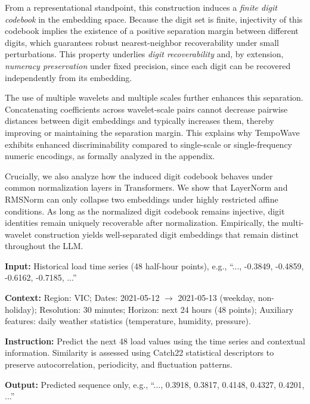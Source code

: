 \documentclass{article}
\begin{document}
From a representational standpoint, this construction induces a \emph{finite digit codebook} in the embedding space.
Because the digit set is finite, injectivity of this codebook implies the existence of a positive separation margin between different digits, which guarantees robust nearest-neighbor recoverability under small perturbations.
This property underlies \textit{digit recoverability} and, by extension, \textit{numeracy preservation} under fixed precision, since each digit can be recovered independently from its embedding.


The use of multiple wavelets and multiple scales further enhances this separation.
Concatenating coefficients across wavelet-scale pairs cannot decrease pairwise distances between digit embeddings and typically increases them, thereby improving or maintaining the separation margin.
This explains why TempoWave exhibits {enhanced discriminability} compared to single-scale or single-frequency numeric encodings, as formally analyzed in the appendix.

Crucially, we also analyze how the induced digit codebook behaves under common normalization layers in Transformers.
We show that LayerNorm and RMSNorm can only collapse two embeddings under highly restricted affine conditions.
As long as the normalized digit codebook remains injective, digit identities remain uniquely recoverable after normalization.
Empirically, the multi-wavelet construction yields well-separated digit embeddings that remain distinct throughout the LLM.













\begin{tcolorbox}[
    colback=blue!5!white,
    colframe=blue!75!black,
    title=\textbf{Full-context prompt example},
    fonttitle=\bfseries
]

\textbf{Input:} Historical load time series (48 half-hour points), e.g.,  
``..., -0.3849, -0.4859, -0.6162, -0.7185, ...''

\textbf{Context:}  
Region: VIC; Dates: 2021-05-12 $\rightarrow$ 2021-05-13 (weekday, non-holiday);  
Resolution: 30 minutes; Horizon: next 24 hours (48 points);  
Auxiliary features: daily weather statistics (temperature, humidity, pressure).

\textbf{Instruction:}  
Predict the next 48 load values using the time series and contextual information.  
Similarity is assessed using Catch22 statistical descriptors to preserve
autocorrelation, periodicity, and fluctuation patterns.

\textbf{Output:} Predicted sequence only, e.g.,  
“..., 0.3918, 0.3817, 0.4148, 0.4327, 0.4201, ...”

\end{tcolorbox}
\end{document}
